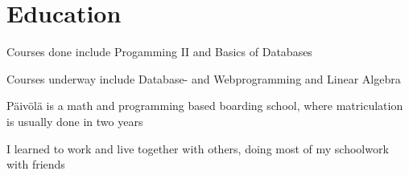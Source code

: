 \documentclass[]{plushcv}
\begin{document}
\begin{minipage}[t]{0.70\textwidth}

\section{Education}

\begin{tightemize}
\item Courses done include Progamming II and Basics of Databases
\item Courses underway include Database- and Webprogramming and Linear Algebra
\end{tightemize}
\sectionsep

\begin{tightemize}
\item Päivölä is a math and programming based boarding school, where matriculation is usually done in two years
\item I learned to work and live together with others, doing most of my schoolwork with friends
\end{tightemize}
\sectionsep




%
%

\end{minipage} 
\hfill
\end{document}
